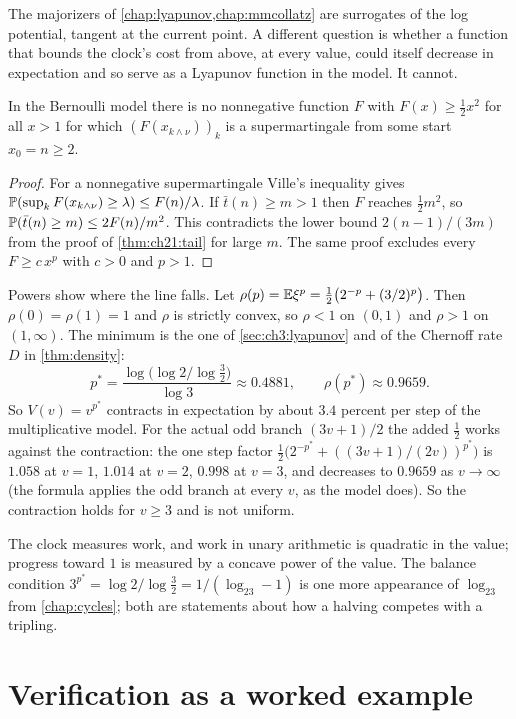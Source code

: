 The majorizers of \cref{chap:lyapunov,chap:mmcollatz} are surrogates of the log potential, tangent at the current point. A different question is whether a function that bounds the clock's cost from above, at every value, could itself decrease in expectation and so serve as a Lyapunov function in the model. It cannot.

\begin{proposition}\label{prop:ch21:nomaj}
In the Bernoulli model there is no nonnegative function $F$ with $F(x)\ge\tfrac12x^2$ for all $x>1$ for which $(F(x_{k\wedge\nu}))_k$ is a supermartingale from some start $x_0=n\ge2$.
\end{proposition}

\begin{proof}
For a nonnegative supermartingale Ville's inequality gives $\mathbb{P}(\sup_kF(x_{k\wedge\nu})\ge\lambda)\le F(n)/\lambda$. If $\bar t(n)\ge m>1$ then $F$ reaches $\tfrac12m^2$, so $\mathbb{P}(\bar t(n)\ge m)\le2F(n)/m^2$. This contradicts the lower bound $2(n-1)/(3m)$ from the proof of \cref{thm:ch21:tail} for large $m$. The same proof excludes every $F\ge c\,x^p$ with $c>0$ and $p>1$.
\end{proof}

Powers show where the line falls. Let $\rho(p)=\mathbb{E}\xi^p=\tfrac12\bigl(2^{-p}+(3/2)^p\bigr)$. Then $\rho(0)=\rho(1)=1$ and $\rho$ is strictly convex, so $\rho<1$ on $(0,1)$ and $\rho>1$ on $(1,\infty)$. The minimum is the one of \cref{sec:ch3:lyapunov} and of the Chernoff rate $D$ in \cref{thm:density}:
\[
p^\ast=\frac{\log\bigl(\log2/\log\tfrac32\bigr)}{\log 3}\approx0.4881,\qquad\rho(p^\ast)\approx0.9659.
\]
So $V(v)=v^{p^\ast}$ contracts in expectation by about $3.4$ percent per step of the multiplicative model. For the actual odd branch $(3v+1)/2$ the added $\tfrac12$ works against the contraction: the one step factor $\tfrac12\bigl(2^{-p^\ast}+((3v+1)/(2v))^{p^\ast}\bigr)$ is $1.058$ at $v=1$, $1.014$ at $v=2$, $0.998$ at $v=3$, and decreases to $0.9659$ as $v\to\infty$ (the formula applies the odd branch at every $v$, as the model does). So the contraction holds for $v\ge3$ and is not uniform.

The clock measures work, and work in unary arithmetic is quadratic in the value; progress toward $1$ is measured by a concave power of the value. The balance condition $3^{p^\ast}=\log2/\log\tfrac32=1/(\log_23-1)$ is one more appearance of $\log_23$ from \cref{chap:cycles}; both are statements about how a halving competes with a tripling.

\section{Verification as a worked example}\label{sec:ch21:verify}

